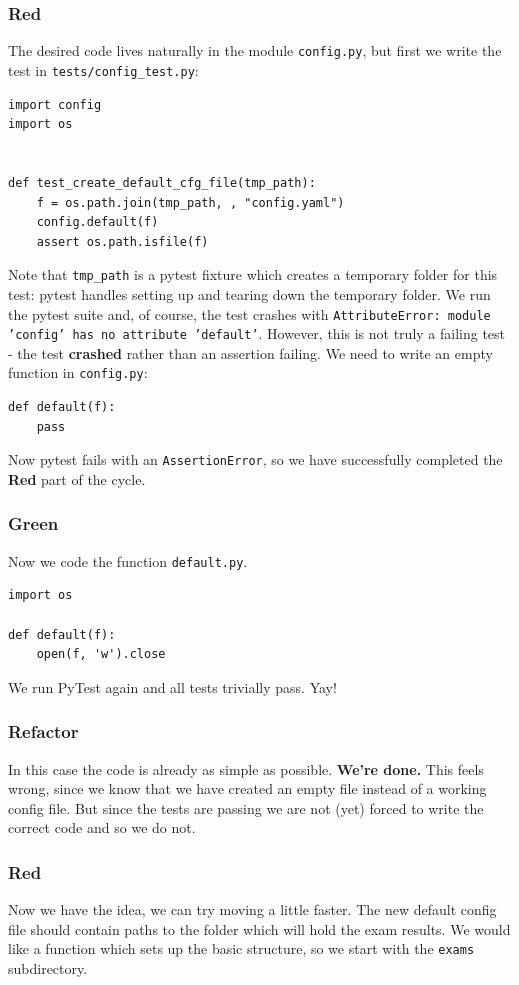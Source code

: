 \documentclass[10pt]{article}
\begin{document}
\subsubsection{Red}
The desired code lives naturally in the module \texttt{config.py}, but first we write the test in \texttt{tests/config\_test.py}:
\begin{lstlisting}
import config
import os


def test_create_default_cfg_file(tmp_path):
    f = os.path.join(tmp_path, , "config.yaml")
    config.default(f)
    assert os.path.isfile(f)
\end{lstlisting}
Note that \texttt{tmp\_path} is a pytest fixture which creates a temporary folder for this test: pytest handles setting up and tearing down the temporary folder. We run the pytest suite and, of course, the test crashes with \texttt{AttributeError: module 'config' has no attribute 'default'}. However, this is not truly a failing test - the test \textbf{crashed} rather than an assertion failing. We need to write an empty function in \texttt{config.py}:
\begin{lstlisting}
def default(f):
    pass
\end{lstlisting}
Now pytest fails with an \texttt{AssertionError}, so we have successfully completed the \textbf{Red} part of the cycle.

\subsubsection{Green}
Now we code the function \texttt{default.py}.
\begin{lstlisting}
import os

def default(f):
    open(f, 'w').close
\end{lstlisting}
We run PyTest again and all tests trivially pass. Yay!

\subsubsection{Refactor}
In this case the code is already as simple as possible. \textbf{We're done.} This feels wrong, since we know that we have created an empty file instead of a working config file. But since the tests are passing we are not (yet) forced to write the correct code and so we do not.

\subsubsection{Red}
Now we have the idea, we can try moving a little faster. The new default config file should contain paths to the folder which will hold the exam results. We would like a function which sets up the basic structure, so we start with the \texttt{exams} subdirectory.
\end{document}
